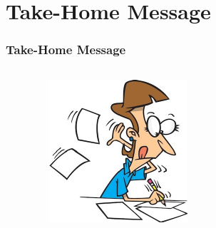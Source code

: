 \documentclass[aspectratio=169]{beamer}
\begin{document}
\section{Take-Home Message}
\begin{frame}
\frametitle{Take-Home Message}
\begin{columns}[c]
\begin{itemize}
\end{itemize}
\begin{center}
\begin{figure}
\includegraphics[width=.8\linewidth]{figures/home.pdf}
\end{figure}
\end{center}
\end{columns}
\end{frame}


\end{document}
